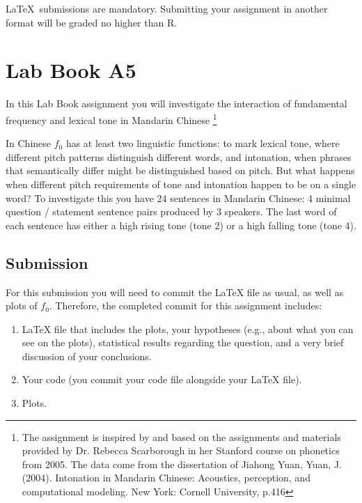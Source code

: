 \documentclass{../labbook}
\begin{document}
\begin{mdframed}[backgroundcolor=blue!20]
\LaTeX ~submissions are mandatory. Submitting your assignment in another format will be graded no higher than R.
\end{mdframed}


\section{Lab Book A5}
In this Lab Book assignment you will investigate the interaction of fundamental frequency and
lexical tone in Mandarin Chinese \footnote{The assignment is inspired by and based on the assignments and materials provided by Dr. Rebecca Scarborough in her Stanford course on phonetics from 2005. 
The data come from the dissertation of Jiahong Yuan, Yuan, J. (2004). Intonation in Mandarin Chinese: Acoustics, perception, and computational modeling. New York: Cornell University, p.416}

In Chinese $f_0$ has at least two linguistic functions: to mark lexical tone, where different pitch patterns distinguish different words, and intonation, when phrases that semantically differ might be distinguished based on pitch. 
But what happens when different pitch requirements of tone and intonation happen to be on a single word?
To investigate this you have 24 sentences in Mandarin Chinese: 4 minimal question / statement sentence pairs produced by 3 speakers. The last word of each sentence has either a high rising tone (tone 2) or a high falling tone (tone 4).


\subsection{Submission}
For this submission you will need to commit the LaTeX file as usual, as well as plots of $f_0$. Therefore, the completed commit for this assignment includes:
\begin{enumerate}
    \item LaTeX file that includes the plots, your hypotheses (e.g., about what you can see on the plots),  statistical results regarding the question, and a very brief discussion of your conclusions.
    \item Your code (you commit your code file alongside your LaTeX file).
    \item Plots.
\end{enumerate}
\end{document}
